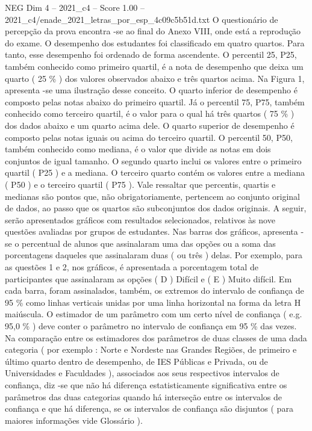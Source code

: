 \begin{textsample}{NEG Dim 4 – 2021\_c4 – Score 1.00 – 2021\_c4/enade\_2021\_letras\_por\_esp\_4c09c5b51d.txt}
O questionário de percepção da prova encontra -se ao final do Anexo VIII, onde está a reprodução do exame.
O desempenho dos estudantes foi classificado em quatro quartos.
Para tanto, esse desempenho foi ordenado de forma ascendente.
O percentil 25, P25, também conhecido como primeiro quartil, é a nota de desempenho que deixa um quarto ( 25 \% ) dos valores observados abaixo e três quartos acima.
Na Figura 1, apresenta -se uma ilustração desse conceito.
O quarto inferior de desempenho é composto pelas notas abaixo do primeiro quartil.
Já o percentil 75, P75, também conhecido como terceiro quartil, é o valor para o qual há três quartos ( 75 \% ) dos dados abaixo e um quarto acima dele.
O quarto superior de desempenho é composto pelas notas iguais ou acima do terceiro quartil.
O percentil 50, P50, também conhecido como mediana, é o valor que divide as notas em dois conjuntos de igual tamanho.
O segundo quarto inclui os valores entre o primeiro quartil ( P25 ) e a mediana.
O terceiro quarto contém os valores entre a mediana ( P50 ) e o terceiro quartil ( P75 ).
Vale ressaltar que percentis, quartis e medianas são pontos que, não obrigatoriamente, pertencem ao conjunto original de dados, ao passo que os quartos são subconjuntos dos dados originais.
A seguir, serão apresentados gráficos com resultados selecionados, relativos às nove questões avaliadas por grupos de estudantes.
Nas barras dos gráficos, apresenta -se o percentual de alunos que assinalaram uma das opções ou a soma das porcentagens daqueles que assinalaram duas ( ou três ) delas.
Por exemplo, para as questões 1 e 2, nos gráficos, é apresentada a porcentagem total de participantes que assinalaram as opções ( D ) Difícil e ( E ) Muito difícil.
Em cada barra, foram assinalados, também, os extremos do intervalo de confiança de 95 \% como linhas verticais unidas por uma linha horizontal na forma da letra H maiúscula.
O estimador de um parâmetro com um certo nível de confiança ( e.g. 95,0 \% ) deve conter o parâmetro no intervalo de confiança em 95 \% das vezes.
Na comparação entre os estimadores dos parâmetros de duas classes de uma dada categoria ( por exemplo : Norte e Nordeste nas Grandes Regiões, de primeiro e último quarto dentro de desempenho, de IES Públicas e Privada, ou de Universidades e Faculdades ), associados aos seus respectivos intervalos de confiança, diz -se que não há diferença estatisticamente significativa entre os parâmetros das duas categorias quando há interseção entre os intervalos de confiança e que há diferença, se os intervalos de confiança são disjuntos ( para maiores informações vide Glossário ).

\end{textsample}

